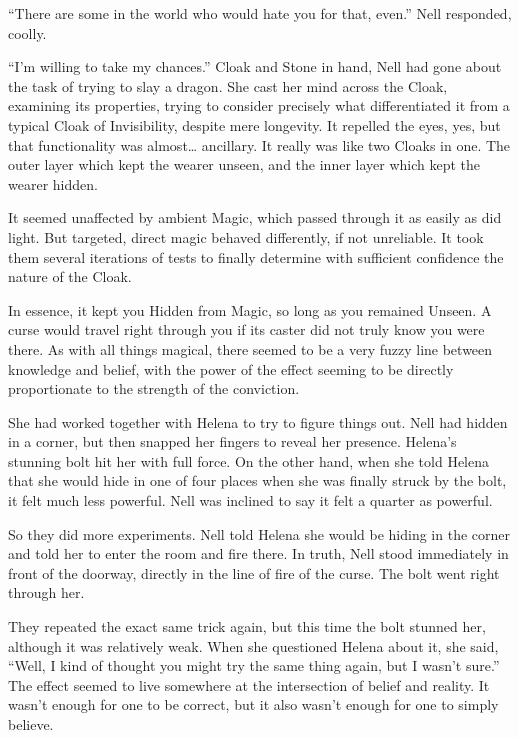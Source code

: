 “There are some in the world who would hate you for that, even.” Nell responded, coolly.

“I’m willing to take my chances.”
\simpleline
Cloak and Stone in hand, Nell had gone about the task of trying to slay a dragon. She cast her mind across the Cloak, examining its properties, trying to consider precisely what differentiated it from a typical Cloak of Invisibility, despite mere longevity. It repelled the eyes, yes, but that functionality was almost… ancillary. It really was like two Cloaks in one. The outer layer which kept the wearer unseen, and the inner layer which kept the wearer hidden.

It seemed unaffected by ambient Magic, which passed through it as easily as did light. But targeted, direct magic behaved differently, if not unreliable. It took them several iterations of tests to finally determine with sufficient confidence the nature of the Cloak.

In essence, it kept you Hidden from Magic, so long as you remained Unseen. A curse would travel right through you if its caster did not truly know you were there. As with all things magical, there seemed to be a very fuzzy line between knowledge and belief, with the power of the effect seeming to be directly proportionate to the strength of the conviction.

She had worked together with Helena to try to figure things out. Nell had hidden in a corner, but then snapped her fingers to reveal her presence. Helena’s stunning bolt hit her with full force. On the other hand, when she told Helena that she would hide in one of four places when she was finally struck by the bolt, it felt much less powerful. Nell was inclined to say it felt a quarter as powerful.

So they did more experiments. Nell told Helena she would be hiding in the corner and told her to enter the room and fire there. In truth, Nell stood immediately in front of the doorway, directly in the line of fire of the curse. The bolt went right through her.

They repeated the exact same trick again, but this time the bolt stunned her, although it was relatively weak. When she questioned Helena about it, she said, “Well, I kind of thought you might try the same thing again, but I wasn’t sure.” The effect seemed to live somewhere at the intersection of belief and reality. It wasn’t enough for one to be correct, but it also wasn’t enough for one to simply believe.

